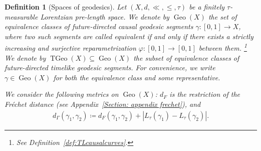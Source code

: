 \documentclass[a4paper,11pt]{article}
\numberwithin{equation}{section}
\theoremstyle{plain}
\newtheorem{Definition}{Definition}[section]
\theoremstyle{definition}
\DeclareMathOperator{\Geo}{Geo}
\DeclareMathOperator{\TGeo}{TGeo}
\begin{document}
\begin{Definition}[Spaces of geodesics]
Let $(X,d,\ll,\leq,\tau)$ be a finitely $\tau$-measurable Lorentzian pre-length space. We denote by $\Geo(X)$ the set of equivalence classes of future-directed causal geodesic segments $\gamma \colon [0, 1] \to X$, where two such segments are called equivalent if and only if there exists a  strictly increasing and surjective reparametrization $\varphi \colon [0,1] \to [0,1]$ between them.%
\footnote{See Definition~\ref{def:TLcausalcurves}.} %
We denote by $\TGeo(X) \subseteq \Geo(X)$ the subset of equivalence classes of future-directed timelike geodesic segments. For convenience, we write $\gamma \in \Geo(X)$ for both the equivalence class and some representative. 

We consider the following metrics on $\Geo(X)$: $d_F$ is the restriction of the Fr\'{e}chet distance (see Appendix~\ref{Section: appendix frechet}), and
\begin{align}
    d_{\Gamma}(\gamma_1,\gamma_2) \coloneqq d_F(\gamma_1,\gamma_2) + |L_{\tau}(\gamma_1) - L_{\tau}(\gamma_2)|.
\end{align}
\end{Definition}
\end{document}
